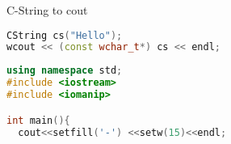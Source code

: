 



\pagestyle{empty}


\begin{multicols*}{3}

C-String to cout
\begin{lstlisting}[language=C++]
CString cs("Hello");
wcout << (const wchar_t*) cs << endl;
\end{lstlisting}
\HRule[4pt]
\begin{lstlisting}[language=C++]
using namespace std;
#include <iostream>
#include <iomanip>

int main(){
  cout<<setfill('-') <<setw(15)<<endl;


\end{lstlisting}
\end{multicols*}
